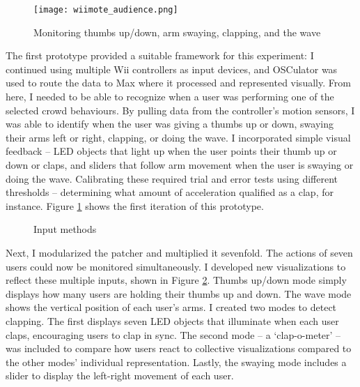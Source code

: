 \begin{figure}
	\centering

	\texttt{[image: wiimote\_audience.png]}
	\caption{Monitoring thumbs up/down, arm swaying, clapping, and the wave}

	\label{prototyping2.1}
\end{figure}

The first prototype provided a suitable framework for this experiment: I continued using multiple Wii controllers as input devices, and OSCulator was used to route the data to Max where it processed and represented visually. From here, I needed to be able to recognize when a user was performing one of the selected crowd behaviours. By pulling data from the controller's motion sensors, I was able to identify when the user was giving a thumbs up or down, swaying their arms left or right, clapping, or doing the wave. I incorporated simple visual feedback -- LED objects that light up when the user points their thumb up or down or claps, and sliders that follow arm movement when the user is swaying or doing the wave. Calibrating these required trial and error tests using different thresholds -- determining what amount of acceleration qualified as a clap, for instance. Figure \ref{prototyping2.1} shows the first iteration of this prototype.

\begin{figure}[p]			%
	\centering

	\hspace{0.1cm}
	\hspace{0.1cm}
	\hspace{0.1cm}
	\hspace{0.1cm}

	\caption{Input methods}

	\label{prototyping2.2}
\end{figure}

Next, I modularized the patcher and multiplied it sevenfold. The actions of seven users could now be monitored simultaneously. I developed new visualizations to reflect these multiple inputs, shown in Figure \ref{prototyping2.2}. Thumbs up/down mode simply displays how many users are holding their thumbs up and down. The wave mode shows the vertical position of each user's arms. I created two modes to detect clapping. The first displays seven LED objects that illuminate when each user claps, encouraging users to clap in sync. The second mode -- a `clap-o-meter' --  was included to compare how users react to collective visualizations compared to the other modes' individual representation.  Lastly, the swaying mode includes a slider to display the left-right movement of each user.

